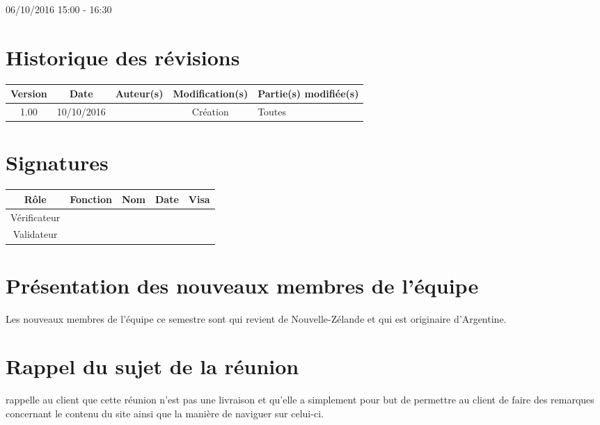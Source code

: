\documentclass [a4paper] {article}
\begin{document}
06/10/2016			 				%
\hfill   
\hfill 	 15:00 - 16:30 				%


\section*{Historique des révisions}
\begin{center}
			\begin{tabular}{| c | c | c | c | p{4cm} |}
				\hline
				\rowcolor{Gray}
				Version & Date & Auteur(s) & Modification(s) & Partie(s) modifiée(s)		 \\
				\hline
				1.00 & 10/10/2016 & \Julie & Création & Toutes \\
		\hline		
			\end{tabular}
		\end{center}

\section*{Signatures}

		\begin{center}
			\begin{tabular}{| c | c | c | c | p{4cm} |}
				\hline
				\rowcolor{Gray}
				Rôle & Fonction & Nom & Date & Visa		 \\
				\hline
				Vérificateur & & & & \\[30pt]
				\hline
				Validateur & & & & \\[30pt]	
				\hline
			\end{tabular}
		\end{center}


\section{Présentation des nouveaux membres de l'équipe}
Les nouveaux membres de l'équipe ce semestre sont \Francois{} qui revient de Nouvelle-Zélande et \Juliana{} qui est originaire d'Argentine.

\section{Rappel du sujet de la réunion}
\Pierre{} rappelle au client que cette réunion n'est pas une livraison et qu'elle a simplement pour but de permettre au client de faire des remarques concernant le contenu du site ainsi que la manière de naviguer sur celui-ci.
\end{document}
